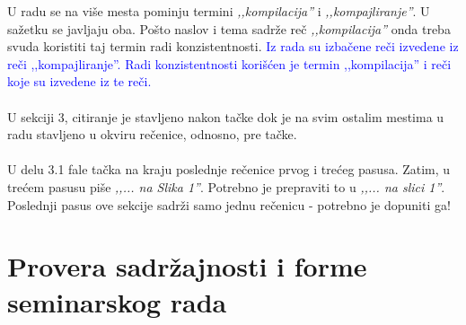 \documentclass[a4paper]{report}
\newcommand{\odgovor}[1]{\textcolor{blue}{#1}}
\begin{document}
\noindent U radu se na više mesta pominju termini \textit{‚‚kompilacija''} i \textit{‚‚kompajliranje''}. U sažetku se javljaju oba. Pošto naslov i tema sadrže reč \textit{‚‚kompilacija''} onda treba svuda koristiti taj termin radi konzistentnosti.
\odgovor{ Iz rada su izbačene reči izvedene iz reči ,,kompajliranje''. Radi konzistentnosti korišćen je termin ,,kompilacija'' i reči koje su izvedene iz te reči.}
\\
\\
U sekciji 3, citiranje je stavljeno nakon tačke dok je na svim ostalim mestima u radu stavljeno u okviru rečenice, odnosno, pre tačke.
\\
\\
U delu 3.1 fale tačka na kraju poslednje rečenice prvog i trećeg pasusa. Zatim, u trećem pasusu piše \textit{‚‚... na Slika 1''}. Potrebno je prepraviti to u \textit{‚‚... na slici 1''}. Poslednji pasus ove sekcije sadrži samo jednu rečenicu - potrebno je dopuniti ga!


\section{Provera sadržajnosti i forme seminarskog rada}
\end{document}
